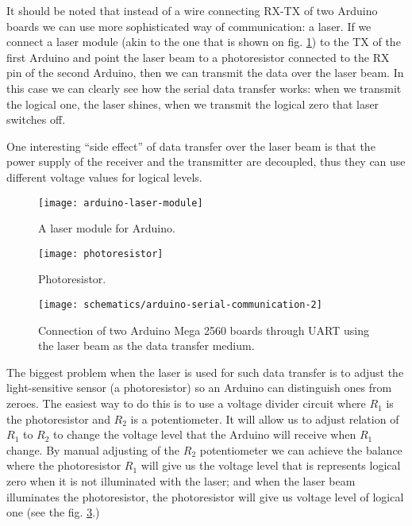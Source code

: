 \documentclass[../sparc.tex]{subfiles}
\begin{document}
It should be noted that instead of a wire connecting RX-TX of two Arduino boards
we can use more sophisticated way of communication: a laser.  If we connect a
laser module (akin to the one that is shown on fig.
\ref{fig:arduino-laser-module}) to the TX of the first Arduino and point the
laser beam to a photoresistor connected to the RX pin of the second Arduino,
then we can transmit the data over the laser beam.  In this case we can clearly
see how the serial data transfer works: when we transmit the logical one, the
laser shines, when we transmit the logical zero that laser switches off.

One interesting ``side effect'' of data transfer over the laser beam is that the
power supply of the receiver and the transmitter are decoupled, thus they can
use different voltage values for logical levels.

\begin{figure}[ht]
  \centering
  \texttt{[image: arduino-laser-module]}
  \caption{A laser module for Arduino.}
  \label{fig:arduino-laser-module}
\end{figure}

\begin{figure}[ht]
  \centering
  \texttt{[image: photoresistor]}
  \caption{Photoresistor.}
  \label{fig:photoresistor}
\end{figure}

\begin{figure}[H]
  \centering
  \texttt{[image: schematics/arduino-serial-communication-2]}
  \caption{Connection of two Arduino Mega 2560 boards through UART using the
    laser beam as the data transfer medium.}
  \label{fig:arduino-serial-communication-2}
\end{figure}

The biggest problem when the laser is used for such data transfer is to adjust
the light-sensitive sensor (a photoresistor) so an Arduino can distinguish ones
from zeroes.  The easiest way to do this is to use a voltage divider circuit
where $R_1$ is the photoresistor and $R_2$ is a potentiometer.  It will allow us
to adjust relation of $R_1$ to $R_2$ to change the voltage level that the
Arduino will receive when $R_1$ change.  By manual adjusting of the $R_2$
potentiometer we can achieve the balance where the photoresistor $R_1$ will give
us the voltage level that is represents logical zero when it is not illuminated
with the laser; and when the laser beam illuminates the photoresistor, the
photoresistor will give us voltage level of logical one (see the
fig. \ref{fig:arduino-serial-communication-2}.)
\end{document}
